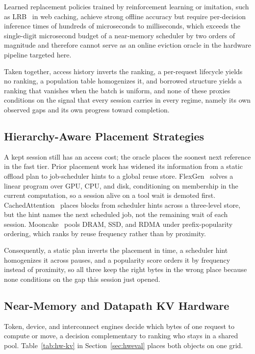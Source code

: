 Learned replacement policies trained by reinforcement learning or
imitation, such as LRB~\cite{song_lrb_2020} in web caching, achieve
strong offline accuracy but require per-decision inference times of
hundreds of microseconds to milliseconds, which exceeds the
single-digit microsecond budget of a near-memory scheduler by two
orders of magnitude and therefore cannot serve as an online eviction
oracle in the hardware pipeline targeted here.

Taken together, access history inverts the ranking, a per-request
lifecycle yields no ranking, a population table homogenizes it, and
borrowed structure yields a ranking that vanishes when the batch is
uniform, and none of these proxies conditions on the signal that every
session carries in every regime, namely its own observed gaps and its own
progress toward completion.

\subsection{Hierarchy-Aware Placement Strategies}
\label{sec:related-place}

A kept session still has an access cost; the oracle places the soonest
next reference in the fast tier. Prior placement work has widened its
information from a static offload plan to job-scheduler hints to a
global reuse store.
FlexGen~\cite{sheng_flexgen_2023} solves a linear program over GPU,
CPU, and disk, conditioning on membership in the current computation, so
a session alive on a tool wait is demoted first.
CachedAttention~\cite{gao_cachedattention_2024} places blocks from
scheduler hints across a three-level store, but the hint names the next
scheduled job, not the remaining wait of each session.
Mooncake~\cite{qin_mooncake_2025} pools DRAM, SSD, and RDMA under
prefix-popularity ordering, which ranks by reuse frequency rather than
by proximity.

Consequently, a static plan inverts the placement in time, a scheduler
hint homogenizes it across pauses, and a popularity score orders it by
frequency instead of proximity, so all three keep the right bytes in
the wrong place because none conditions on the gap this session just
opened.

\subsection{Near-Memory and Datapath KV Hardware}
\label{sec:related-hw}

Token, device, and interconnect engines decide which bytes of one
request to compute or move, a decision complementary to ranking who
stays in a shared pool. Table~\ref{tab:hw-kv} in
Section~\ref{sec:hweval} places both objects on one grid.

